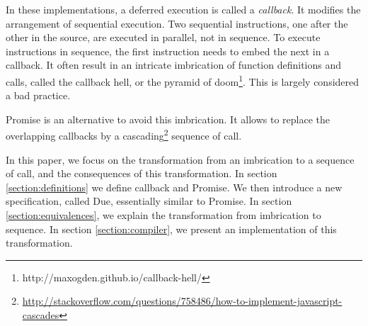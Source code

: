 In these implementations, a deferred execution is called a \textit{callback}.
It modifies the arrangement of sequential execution.
Two sequential instructions, one after the other in the source, are executed in parallel, not in sequence.
To execute instructions in sequence, the first instruction needs to embed the next in a callback.
It often result in an intricate imbrication of function definitions and calls, called the callback hell, or the pyramid of doom\footnote{\raggedright http://maxogden.github.io/callback-hell/}.
This is largely considered a bad practice.

Promise is an alternative to avoid this imbrication.
It allows to replace the overlapping callbacks by a cascading\footnote{\url{http://stackoverflow.com/questions/758486/how-to-implement-javascript-cascades}} sequence of call.

In this paper, we focus on the transformation from an imbrication to a sequence of call, and the consequences of this transformation.
In section \ref{section:definitions} we define callback and Promise.
We then introduce a new specification, called Due, essentially similar to Promise.
In section \ref{section:equivalences}, we explain the transformation from imbrication to sequence.
In section \ref{section:compiler}, we present an implementation of this transformation.

